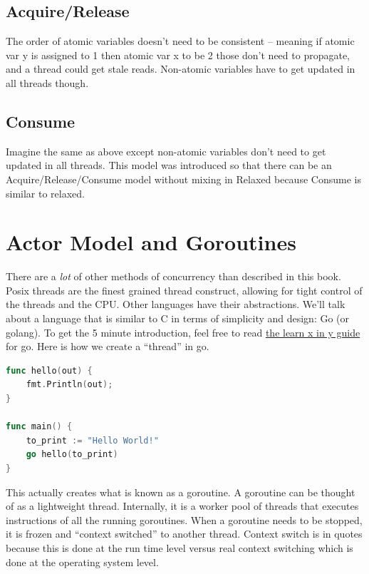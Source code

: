 \subsection{Acquire/Release}

The order of atomic variables doesn't need to be consistent -- meaning if atomic var y is assigned to 1 then atomic var x to be 2 those don't need to propagate, and a thread could get stale reads.
Non-atomic variables have to get updated in all threads though.

\subsection{Consume}

Imagine the same as above except non-atomic variables don't need to get updated in all threads.
This model was introduced so that there can be an Acquire/Release/Consume model without mixing in Relaxed because Consume is similar to relaxed.

\section{Actor Model and Goroutines}

There are a \textit{lot} of other methods of concurrency than described in this book.
Posix threads are the finest grained thread construct, allowing for tight control of the threads and the CPU.
Other languages have their abstractions.
We'll talk about a language that is similar to C in terms of simplicity and design: Go (or golang).
To get the 5 minute introduction, feel free to read \href{https://learnxinyminutes.com/docs/go/}{the learn x in y guide} for go.
Here is how we create a ``thread'' in go.

\begin{lstlisting}[language=Go]
func hello(out) {
    fmt.Println(out);
}

func main() {
    to_print := "Hello World!"
    go hello(to_print)
}
\end{lstlisting}

This actually creates what is known as a goroutine.
A goroutine can be thought of as a lightweight thread.
Internally, it is a worker pool of threads that executes instructions of all the running goroutines.
When a goroutine needs to be stopped, it is frozen and ``context switched'' to another thread.
Context switch is in quotes because this is done at the run time level versus real context switching which is done at the operating system level.

